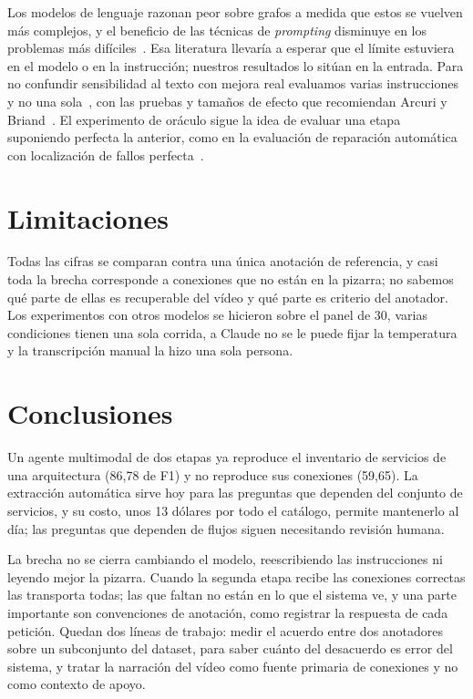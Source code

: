 \documentclass[a4paper, twocolumn, 10pt]{IEEEtran}
\begin{document}
Los modelos de lenguaje razonan peor sobre grafos a medida que estos se vuelven más
complejos, y el beneficio de las técnicas de \emph{prompting} disminuye en los
problemas más difíciles~\cite{Fatemi2024TalkLikeAGraph, Wang2023NLGraph}. Esa
literatura llevaría a esperar que el límite estuviera en el modelo o en la
instrucción; nuestros resultados lo sitúan en la entrada. Para no confundir
sensibilidad al texto con mejora real evaluamos varias instrucciones y no una
sola~\cite{Mizrahi2024MultiPromptEval}, con las pruebas y tamaños de efecto que
recomiendan Arcuri y Briand~\cite{Arcuri2011StatisticalSE}. El experimento de
oráculo sigue la idea de evaluar una etapa suponiendo perfecta la anterior, como en
la evaluación de reparación automática con localización de fallos
perfecta~\cite{Liu2019FaultLocalizationBias}.

\section{Limitaciones}

Todas las cifras se comparan contra una única anotación de referencia, y casi toda
la brecha corresponde a conexiones que no están en la pizarra; no sabemos qué parte
de ellas es recuperable del vídeo y qué parte es criterio del anotador. Los
experimentos con otros modelos se hicieron sobre el panel de 30, varias condiciones
tienen una sola corrida, a Claude no se le puede fijar la temperatura y la
transcripción manual la hizo una sola persona.

\section{Conclusiones}

Un agente multimodal de dos etapas ya reproduce el inventario de servicios de una
arquitectura (86,78 de F1) y no reproduce sus conexiones (59,65). La extracción
automática sirve hoy para las preguntas que dependen del conjunto de servicios, y su
costo, unos 13 dólares por todo el catálogo, permite mantenerlo al día; las
preguntas que dependen de flujos siguen necesitando revisión humana.

La brecha no se cierra cambiando el modelo, reescribiendo las instrucciones ni
leyendo mejor la pizarra. Cuando la segunda etapa recibe las conexiones correctas
las transporta todas; las que faltan no están en lo que el sistema ve, y una parte
importante son convenciones de anotación, como registrar la respuesta de cada
petición. Quedan dos líneas de trabajo: medir el acuerdo entre dos anotadores sobre
un subconjunto del dataset, para saber cuánto del desacuerdo es error del sistema, y
tratar la narración del vídeo como fuente primaria de conexiones y no como contexto
de apoyo.



\end{document}
